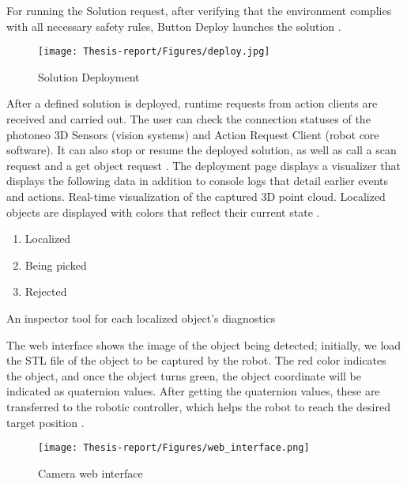 \documentclass[12pt]{article}
\begin{document}
For running the Solution request, after verifying that the environment complies with all necessary safety rules, Button Deploy launches the solution \cite{ref2}.\\

\begin{figure}[h]
    \centering
    \texttt{[image: Thesis-report/Figures/deploy.jpg]}
    \caption{Solution Deployment\cite{ref2}} 
    \label{fig:solution-deployment}
\end{figure}
    
After a defined solution is deployed, runtime requests from action clients are received and carried out.  The user can check the connection statuses of the photoneo 3D Sensors (vision systems) and Action Request Client (robot core software).  It can also stop or resume the deployed solution, as well as call a scan request and a get object request \cite{ref2}.
The deployment page displays a visualizer that displays the following data in addition to console logs that detail earlier events and actions. Real-time visualization of the captured 3D point cloud. Localized objects are displayed with colors that reflect their current state \cite{ref2}.

\begin{enumerate}
    \item Localized \colorbox{green}\\ 
    \item Being picked \colorbox{blue}\\
    \item Rejected \colorbox{red}\\
\end{enumerate}

An inspector tool for each localized object's diagnostics\cite{ref2}

The web interface shows the image of the object being detected; initially, we load the STL file of the object to be captured by the robot. The red color indicates the object, and once the object turns green, the object coordinate will be indicated as quaternion values. After getting the quaternion values, these are transferred to the robotic controller, which helps the robot to reach the desired target position \cite{ref2}.

\begin{figure}[h]
    \centering
    \texttt{[image: Thesis-report/Figures/web\_interface.png]} 
    \caption{Camera web interface}
    \label{fig:web-interface}
\end{figure}
\end{document}

